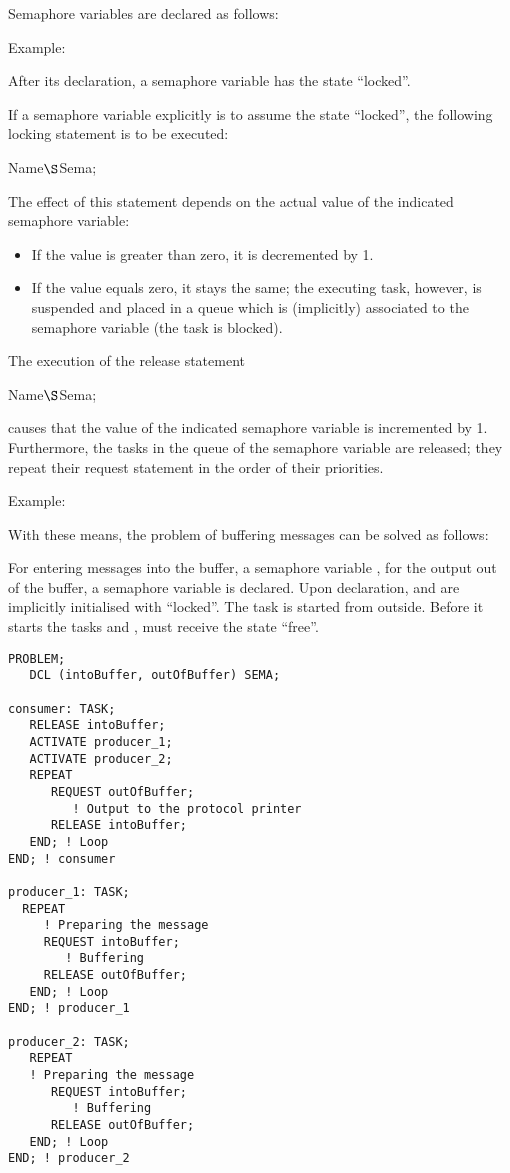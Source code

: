 Semaphore variables are declared as follows:

\code{;}

Example:


After its declaration, a semaphore variable has the state ``locked''.

If a semaphore variable explicitly is to assume the state ``locked'',
the following locking statement is to be executed:

 Name$\S $Sema;

The effect of this statement depends on the actual value of the
indicated semaphore variable:
\begin{itemize}
\item If the value is greater than zero, it is decremented by 1.
\item If the value equals zero, it stays the same; the executing task,
however, is suspended and placed in a queue which is (implicitly)
associated to the semaphore variable (the task is blocked).
\end{itemize}

The execution of the release statement

 Name$\S $Sema;

causes that the value of the indicated semaphore variable is incremented
by 1. Furthermore, the tasks in the queue of the semaphore variable are
released; they repeat their request statement in the order of their
priorities.

Example:

With these means, the problem of buffering messages can be solved as
follows:

For entering messages into the buffer, a semaphore variable
, for the output out of the buffer, a semaphore variable
 is declared. Upon declaration,  and
 are implicitly initialised with ``locked''. The task
  is started from outside. Before it starts the tasks 
 and
,  must receive the state ``free''.

\begin{lstlisting}
PROBLEM;
   DCL (intoBuffer, outOfBuffer) SEMA;

consumer: TASK;
   RELEASE intoBuffer;
   ACTIVATE producer_1;
   ACTIVATE producer_2;
   REPEAT
      REQUEST outOfBuffer;
         ! Output to the protocol printer
      RELEASE intoBuffer;
   END; ! Loop
END; ! consumer

producer_1: TASK;
  REPEAT
     ! Preparing the message 
     REQUEST intoBuffer;
        ! Buffering
     RELEASE outOfBuffer;
   END; ! Loop
END; ! producer_1

producer_2: TASK;
   REPEAT
   ! Preparing the message
      REQUEST intoBuffer;
         ! Buffering
      RELEASE outOfBuffer;
   END; ! Loop
END; ! producer_2
\end{lstlisting}

